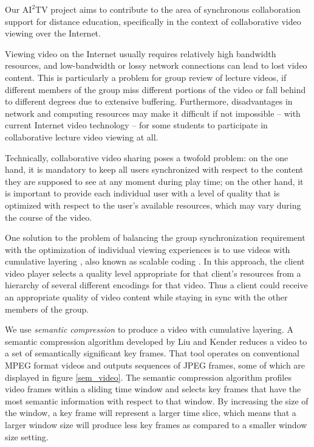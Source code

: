 \documentclass{sig-alternate}
\begin{document}


Our $\mathrm{AI}^2$TV project aims to contribute to the area of
synchronous collaboration support for distance education, specifically
in the context of collaborative video viewing over the Internet.

Viewing video on the Internet usually requires relatively high
bandwidth resources, and low-bandwidth or lossy network connections
can lead to lost video content.  This is particularly a problem for
group review of lecture videos, if different members of the group miss
different portions of the video or fall behind to different degrees
due to extensive buffering.  Furthermore, disadvantages in network and
computing resources may make it difficult if not impossible -- with
current Internet video technology -- for some students to participate
in collaborative lecture video viewing at all.

Technically, collaborative video sharing poses a twofold problem: on
the one hand, it is mandatory to keep all users synchronized with
respect to the content they are supposed to see at any moment during
play time; on the other hand, it is important to provide each
individual user with a level of quality that is optimized with respect
to the user's available resources, which may vary during the course of
the video.

One solution to the problem of balancing the group synchronization
requirement with the optimization of individual viewing experiences is
to use videos with cumulative layering \cite{mccanne96receiverdriven},
also known as scalable coding \cite{LI}.  In this approach, the client
video player selects a quality level appropriate for that client's
resources from a hierarchy of several different encodings for that
video. Thus a client could receive an appropriate quality of video
content while staying in sync with the other members of the group.



We use {\em semantic compression} to produce a video with cumulative
layering.  A semantic compression algorithm developed by Liu and
Kender \cite{TIECHENG} reduces a video to a set of semantically
significant key frames.  That tool operates on conventional MPEG
format videos and outputs sequences of JPEG frames, some of which are
displayed in figure \ref{sem_video}.  The semantic compression
algorithm profiles video frames within a sliding time window and
selects key frames that have the most semantic information with
respect to that window.  By increasing the size of the window, a key
frame will represent a larger time slice, which means that a larger
window size will produce less key frames as compared to a smaller
window size setting.
\end{document}
